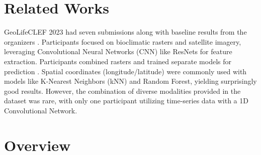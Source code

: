 \section{Related Works}

GeoLifeCLEF 2023 had seven submissions along with baseline results from the organizers \cite{geolifeclef2023}. 
Participants focused on bioclimatic rasters and satellite imagery, leveraging Convolutional Neural Networks (CNN) like ResNets \cite{he2016deep} for feature extraction. 
Participants combined rasters and trained separate models for prediction \cite{Ung2023LeverageSW}. 
Spatial coordinates (longitude/latitude) were commonly used with models like K-Nearest Neighbors (kNN) and Random Forest, yielding surprisingly good results. 
However, the combination of diverse modalities provided in the dataset was rare, with only one participant utilizing time-series data with a 1D Convolutional Network.

\section{Overview}

